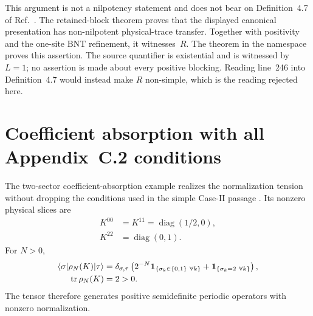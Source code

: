 \documentclass{article}
\begin{document}
This argument is not a nilpotency statement and does not bear on
Definition~4.7 of Ref.~\cite{Cirac2016MPDO_arXiv}. The retained-block theorem
proves that the displayed canonical presentation has non-nilpotent
physical-trace transfer. Together with positivity and the one-site BNT
refinement, it witnesses \,$R$. The theorem
 in the namespace
 proves this assertion.
The source quantifier is existential and is witnessed by $L=1$; no assertion
is made about every positive blocking. Reading line~246 into Definition~4.7
would instead make $R$ non-simple, which is the reading rejected here.

\section{Coefficient absorption with all Appendix~C.2 conditions}

The two-sector coefficient-absorption example realizes the normalization
tension without dropping the conditions used in the simple Case-II passage
\cite[lines~1628--1665 and 1740--1782]{Cirac2016MPDO_arXiv}. Its nonzero
physical slices are
\begin{align}
    K^{00}
    &=K^{11}
    =\operatorname{diag}(1/2,0),
    \label{eq:uw_caseii_equal_slices}\\
    K^{22}
    &=\operatorname{diag}(0,1).
    \label{eq:uw_caseii_third_slice}
\end{align}
For $N>0$,
\begin{align}
    \langle \sigma|\rho_N(K)|\tau\rangle
    &=\delta_{\sigma,\tau}\left(2^{-N}\mathbf 1_{\{\sigma_k\in\{0,1\}\ \forall k\}}
      +\mathbf 1_{\{\sigma_k=2\ \forall k\}}\right),
    \label{eq:uw_caseii_mpo_entries}\\
    \operatorname{tr}\rho_N(K)
    &=2>0.
    \label{eq:uw_caseii_mpo_trace}
\end{align}
The tensor therefore generates positive semidefinite periodic operators with
nonzero normalization.
\end{document}
